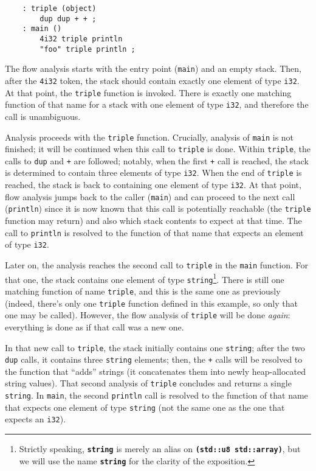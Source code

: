 \begin{verbatim}
    : triple (object)
        dup dup + + ;
    : main ()
        4i32 triple println
        "foo" triple println ;
\end{verbatim}

The flow analysis starts with the entry point (\verb|main|) and an empty
stack. Then, after the \verb|4i32| token, the stack should contain
exactly one element of type \verb|i32|. At that point, the \verb|triple|
function is invoked. There is exactly one matching function of that name
for a stack with one element of type \verb|i32|, and therefore the call
is unambiguous.

Analysis proceeds with the \verb|triple| function. Crucially, analysis
of \verb|main| is not finished; it will be continued when this call to
\verb|triple| is done. Within \verb|triple|, the calls to \verb|dup| and
\verb|+| are followed; notably, when the first \verb|+| call is reached,
the stack is determined to contain three elements of type \verb|i32|.
When the end of \verb|triple| is reached, the stack is back to
containing one element of type \verb|i32|. At that point, flow analysis
jumps back to the caller (\verb|main|) and can proceed to the next call
(\verb|println|) since it is now known that this call is potentially
reachable (the \verb|triple| function may return) and also which stack
contents to expect at that time. The call to \verb|println| is resolved
to the function of that name that expects an element of type \verb|i32|.

Later on, the analysis reaches the second call to \verb|triple| in the
\verb|main| function. For that one, the stack contains one element of
type \verb|string|\footnote{Strictly speaking, \texttt{\textbf{string}}
is merely an alias on \texttt{\textbf{(std::u8 std::array)}}, but we
will use the name \texttt{\textbf{string}} for the clarity of the
exposition.}. There is still one matching function of name
\verb|triple|, and this is the same one as previously (indeed, there's
only one \verb|triple| function defined in this example, so only that
one may be called). However, the flow analysis of \verb|triple| will be
done \emph{again}: everything is done as if that call was a new one.

In that new call to \verb|triple|, the stack initially contains one
\verb|string|; after the two \verb|dup| calls, it contains three
\verb|string| elements; then, the \verb|+| calls will be resolved to the
function that ``adds'' strings (it concatenates them into newly
heap-allocated string values). That second analysis of \verb|triple|
concludes and returns a single \verb|string|. In \verb|main|, the second
\verb|println| call is resolved to the function of that name that
expects one element of type \verb|string| (not the same one as the one
that expects an \verb|i32|).

